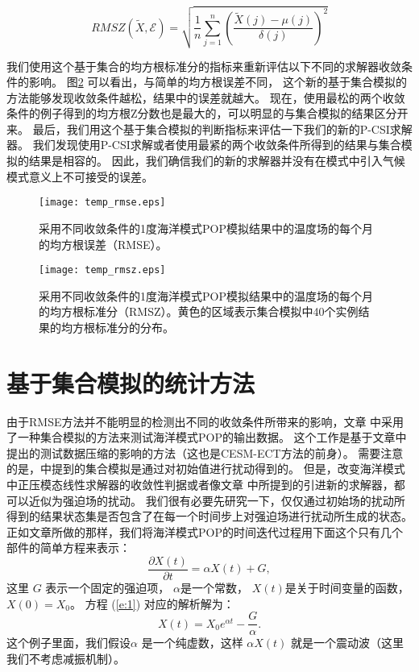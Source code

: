 $$ RMSZ(\tilde{X}, \mathcal{E}) =  \sqrt{\frac{1}{n}\sum_{j=1}^n(\frac{\tilde{X}(j) -\mu (j)}{\delta (j)})^2}$$

我们使用这个基于集合的均方根标准分的指标来重新评估以下不同的求解器收敛条件的影响。 
图\ref{fig:ssh_rmsz_t} 可以看出，与简单的均方根误差不同， 这个新的基于集合模拟的方法能够发现收敛条件越松，结果中的误差就越大。 
现在，使用最松的两个收敛条件的例子得到的均方根Z分数也是最大的，可以明显的与集合模拟的结果区分开来。 
最后，我们用这个基于集合模拟的判断指标来评估一下我们的新的P-CSI求解器。 我们发现使用P-CSI求解或者使用最紧的两个收敛条件所得到的结果与集合模拟的结果是相容的。 
因此，我们确信我们的新的求解器并没有在模式中引入气候模式意义上不可接受的误差。 


\begin{figure}[!t]
\begin{center}
\texttt{[image: temp\_rmse.eps]}
\end{center}
\caption[] {采用不同收敛条件的1度海洋模式POP模拟结果中的温度场的每个月的均方根误差（RMSE）。}
\label{fig:ssh_rmse_t}
\end{figure}
\begin{figure}[!t]
\begin{center}
\texttt{[image: temp\_rmsz.eps]}
\end{center}
\caption[] {采用不同收敛条件的1度海洋模式POP模拟结果中的温度场的每个月的均方根标准分（RMSZ）。黄色的区域表示集合模拟中40个实例结果的均方根标准分的分布。 }
\label{fig:ssh_rmsz_t}
\end{figure}


\section{基于集合模拟的统计方法}\label{se:ver}
由于RMSE方法并不能明显的检测出不同的收敛条件所带来的影响，文章  中采用了一种集合模拟的方法来测试海洋模式POP的输出数据。 
这个工作是基于文章中提出的测试数据压缩的影响的方法（这也是CESM-ECT方法的前身）。
需要注意的是，中提到的集合模拟是通过对初始值进行扰动得到的。 
但是，改变海洋模式中正压模态线性求解器的收敛性判据或者像文章 中所提到的引进新的求解器，都可以近似为强迫场的扰动。 
我们很有必要先研究一下，仅仅通过初始场的扰动所得到的结果状态集是否包含了在每一个时间步上对强迫场进行扰动所生成的状态。
正如文章所做的那样，我们将海洋模式POP的时间迭代过程用下面这个只有几个部件的简单方程来表示：
\begin{equation}
\frac{\partial X(t)}{\partial t} = \alpha X(t) +G,
\label{e:1}
\end{equation}
这里 $G$ 表示一个固定的强迫项，  $\alpha$是一个常数，  $X(t)$是关于时间变量的函数， $X(0) = X_0$。 
方程 (\ref{e:1}) 对应的解析解为：
\begin{equation}
X(t) = X_0e^{\alpha t } -\frac{G}{\alpha}. 
\label{e:2}
\end{equation}
这个例子里面，我们假设$\alpha$ 是一个纯虚数，这样 $\alpha X(t)$ 就是一个震动波（这里我们不考虑减振机制）。 

